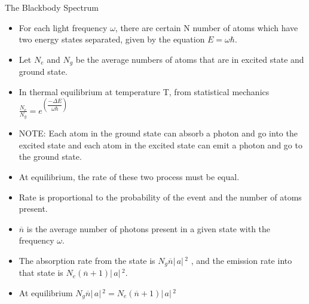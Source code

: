 \documentclass[aspectratio=169]{beamer}
\begin{document}
\begin{frame}{The Blackbody Spectrum}
	\begin{itemize}
	 \item For each light frequency $\omega$, there are certain N number of atoms which have two energy states separated, given by the equation $E = \omega\hbar$. \pause \newline
	 \item Let $N_e$ and $N_g$ be the average numbers of atoms that are in excited state and ground state. \pause \newline
	 \item In thermal equilibrium at temperature T, from statistical mechanics \pause \newline
	 $\frac{N_e}{N_g} = e^{\left(\dfrac{-\Delta E}{\omega\hbar}\right)}$  \pause \newline
	\item NOTE: Each atom in the ground state can absorb a photon and go into the excited state and each atom in the excited state can emit a photon and go to the ground state.
	\end{itemize}
\end{frame} 

\begin{frame}
	\begin{itemize}
		\item At equilibrium, the rate of these two process must be equal. \pause \newline
		\item Rate is proportional to the probability of the event and the number of atoms present.\pause \newline
		\item $\overline{n}$ is the average number of photons present in a given state with the frequency $\omega$.
	\end{itemize}
\end{frame}

\begin{frame}
	\begin{itemize}
		\item The absorption rate from the state is $N_{g}\overline{n}\rvert\,a\rvert\,^{2}$ , and the emission rate into that state is $N_{e}(\overline{n}+1)\rvert\,a\rvert\,^{2}$.
		\item At equilibrium  $N_{g}\overline{n}\rvert\,a\rvert\,^{2} = N_{e}(\overline{n}+1)\rvert\,a\rvert\,^{2}$
	\end{itemize}
\end{frame}
\end{document}
